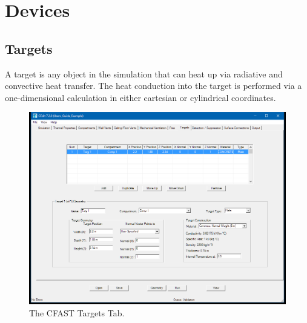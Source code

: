 \chapter{Devices}
\section{Targets}
\label{info:DEVC}

A target is any object in the simulation that can heat up via radiative and convective heat transfer. The heat conduction into the target is performed via a one-dimensional calculation in either cartesian or cylindrical coordinates.

\begin{figure}[h!]
\begin{center}
\includegraphics[width=6.5in]{FIGURES/Target_Tab}
\caption[The CFAST Targets Tab]{The CFAST Targets Tab.}
\end{center}
\end{figure}


